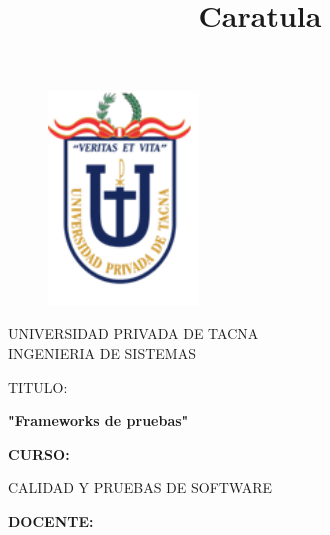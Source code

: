 \documentclass[12pt,letterpaper]{article}
\begin{document}
\title{Caratula}
\begin{titlepage}
\begin{figure}[htb]
\begin{center}
\includegraphics[width=4cm]{./Imagenes/logo.png}
\end{center}
\end{figure}
\vspace*{-0.25in}
\begin{center}
\large{UNIVERSIDAD PRIVADA DE TACNA}\\
\vspace*{-0.025in}
INGENIERIA DE SISTEMAS  \\

\vspace*{0.5in}
\begin{large}
TITULO:\\
\end{large}

\vspace*{0.1in}
\begin{Large}

\textbf{"Frameworks de pruebas"} \\
\end{Large}

\vspace*{0.3in}
\begin{Large}
\textbf{CURSO:} \\
\end{Large}

\vspace*{0.1in}
\begin{large}
CALIDAD Y PRUEBAS DE SOFTWARE\\
\end{large}

\vspace*{0.3in}
\begin{Large}
\textbf{DOCENTE:} \\
\end{Large}


\end{center}
\end{titlepage}
\end{document}
